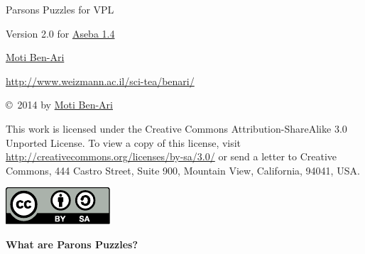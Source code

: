 \documentclass[11pt,a4paper,english]{report}
\begin{document}
\thispagestyle{empty}

\begin{center}
\begin{Huge}
\begin{bfseries}
Parsons Puzzles for VPL
\end{bfseries}
\end{Huge}

\bigskip
\bigskip

\begin{Large}
Version 2.0
for \href{https://aseba.wikidot.com/en:downloadinstall}{Aseba 1.4}
\end{Large}


\bigskip
\bigskip
\bigskip
\bigskip
\bigskip

\begin{LARGE}
\href{http://www.weizmann.ac.il/sci-tea/benari/}{Moti Ben-Ari}
\end{LARGE}

\begin{Large}
\href{http://www.weizmann.ac.il/sci-tea/benari/}{http://www.weizmann.ac.il/sci-tea/benari/}
\end{Large}

\end{center}

\vfill

\begin{center}
\copyright{}\  2014 by \href{http://www.weizmann.ac.il/sci-tea/benari/}{Moti Ben-Ari}%
\end{center}

This work is licensed under the Creative Commons
Attribution-ShareAlike 3.0 Unported License. To view a copy
of this license, visit
\url{http://creativecommons.org/licenses/by-sa/3.0/}
or send a letter to Creative Commons, 444 Castro Street, Suite 900,
Mountain View, California, 94041, USA.

\begin{center}
\includegraphics[width=.2\textwidth]{by-sa}
\end{center}

\newpage
\thispagestyle{empty}
\setcounter{page}{1}


\begin{center}
\LARGE \textbf{What are Parons Puzzles?}
\end{center}
\end{document}
